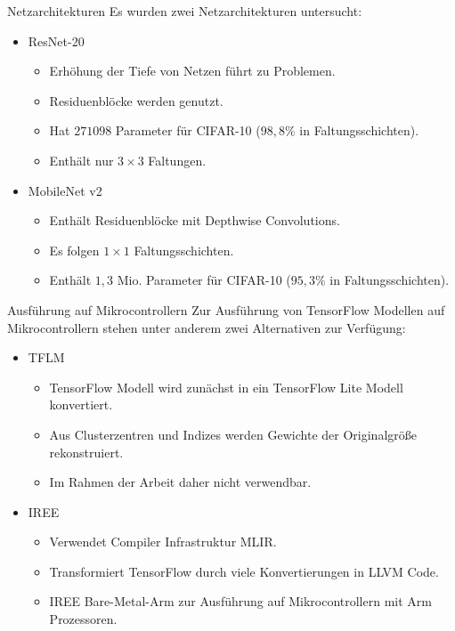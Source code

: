 \documentclass[aspectratio=169, 12pt]{beamer}
\begin{document}
\begin{frame}{Netzarchitekturen}
  Es wurden zwei Netzarchitekturen untersucht:
  \begin{itemize}
    \item ResNet-20
    \begin{itemize}
      \item Erhöhung der Tiefe von Netzen führt zu Problemen.
      \item Residuenblöcke werden genutzt.
      \item Hat $271098$ Parameter für CIFAR-10 ($98{,}8\%$ in Faltungsschichten).
      \item Enthält nur $3 \times 3$ Faltungen.
    \end{itemize}
    \item MobileNet v2
    \begin{itemize}
      \item Enthält Residuenblöcke mit \glqq Depthwise Convolutions\grqq{}.
      \item Es folgen $1 \times 1$ Faltungsschichten.
      \item Enthält $1{,}3$ Mio. Parameter für CIFAR-10 ($95{,}3\%$ in Faltungsschichten).
    \end{itemize}
  \end{itemize}
\end{frame}

\begin{frame}{Ausführung auf Mikrocontrollern}
  Zur Ausführung von TensorFlow Modellen auf Mikrocontrollern stehen unter anderem zwei Alternativen zur Verfügung:
  \begin{itemize}
    \item TFLM
    \begin{itemize}
      \item TensorFlow Modell wird zunächst in ein TensorFlow Lite Modell konvertiert.
      \item Aus Clusterzentren und Indizes werden Gewichte der Originalgröße rekonstruiert.
      \item Im Rahmen der Arbeit daher nicht verwendbar.
    \end{itemize}
    \item IREE
    \begin{itemize}
      \item Verwendet Compiler Infrastruktur MLIR.
      \item Transformiert TensorFlow durch viele Konvertierungen in LLVM Code.
      \item IREE Bare-Metal-Arm zur Ausführung auf Mikrocontrollern mit Arm Prozessoren.
    \end{itemize}
  \end{itemize}
\end{frame}
\end{document}
